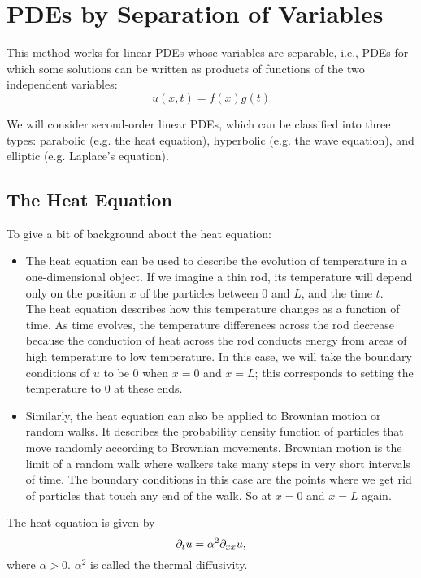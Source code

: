 \section{PDEs by Separation of Variables}

This method works for linear PDEs whose variables are separable, i.e., PDEs for which some solutions can be written as products of functions of the two independent variables:
\[
	u(x,t) = f(x)g(t)
\]

We will consider second-order linear PDEs, which can be classified into three types: parabolic (e.g. the heat equation), hyperbolic (e.g. the wave equation), and elliptic (e.g. Laplace's equation).

\subsection{The Heat Equation}

To give a bit of background about the heat equation:
\begin{itemize}
	\item The heat equation can be used to describe the evolution of temperature in a one-dimensional object. If we imagine a thin rod, its temperature will depend only on the position $x$ of the particles between $0$ and $L$, and the time $t$. \\
	The heat equation describes how this temperature changes as a function of time. As time evolves, the temperature differences across the rod decrease because the conduction of heat across the rod conducts energy from areas of high temperature to low temperature. In this case, we will take the boundary conditions of $u$ to be 0 when $x=0$ and $x=L$; this corresponds to setting the temperature to 0 at these ends.
	
	\item Similarly, the heat equation can also be applied to Brownian motion or random walks. It describes the probability density function of particles that move randomly according to Brownian movements. Brownian motion is the limit of a random walk where walkers take many steps in very short intervals of time. The boundary conditions in this case are the points where we get rid of particles that touch any end of the walk. So at $x=0$ and $x=L$ again.
\end{itemize}

The heat equation is given by 
\begin{equation}\label{eq5.1}
	\partial_t u = \alpha^2 \partial_{xx} u,
\end{equation} 
where $\alpha > 0$. $\alpha^2$ is called the thermal diffusivity.

